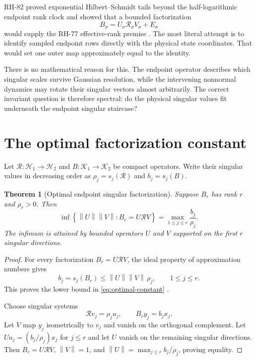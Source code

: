 \documentclass[11pt]{article}
\newtheorem{theorem}{Theorem}[section]
\theoremstyle{remark}
\newcommand{\norm}[1]{\left\lVert#1\right\rVert}
\newcommand{\cR}{\mathcal R}
\begin{document}
RH-82 proved exponential Hilbert--Schmidt tails beyond the half-logarithmic
endpoint rank clock and showed that a bounded factorization
\begin{equation}
 B_\sigma=U_\sigma\cR_\sigma V_\sigma+E_\sigma
 \label{eq:desired}
\end{equation}
would supply the RH-77 effective-rank premise \citep{WangHalfLog2026}.  The
most literal attempt is to identify sampled endpoint rows directly with the
physical state coordinates.  That would set one outer map approximately equal
to the identity.

There is no mathematical reason for this.  The endpoint operator describes
which singular scales survive Gaussian resolution, while the intervening
nonnormal dynamics may rotate their singular vectors almost arbitrarily.  The
correct invariant question is therefore spectral: do the physical singular
values fit underneath the endpoint singular staircase?

\section{The optimal factorization constant}

Let $\cR:\mathcal H_1\to\mathcal H_2$ and
$B:\mathcal K_1\to\mathcal K_2$ be compact operators.  Write their singular
values in decreasing order as $\rho_j=s_j(\cR)$ and $b_j=s_j(B)$.

\begin{theorem}[Optimal endpoint singular factorization]
\label{thm:optimal}
Suppose $B_r$ has rank $r$ and $\rho_r>0$.  Then
\begin{equation}
 \boxed{
 \inf\left\{\norm U\norm V:B_r=U\cR V\right\}
 =\max_{1\le j\le r}\frac{b_j}{\rho_j}.}
 \label{eq:optimal-constant}
\end{equation}
The infimum is attained by bounded operators $U$ and $V$ supported on the
first $r$ singular directions.
\end{theorem}

\begin{proof}
For every factorization $B_r=U\cR V$, the ideal property of approximation
numbers gives
\[
 b_j=s_j(B_r)\le\norm U\norm V\,\rho_j,
 \qquad1\le j\le r.
\]
This proves the lower bound in \eqref{eq:optimal-constant}
\citep{Simon2005}.

Choose singular systems
\[
 \cR v_j=\rho_j u_j,
 \qquad B_r y_j=b_jx_j.
\]
Let $V$ map $y_j$ isometrically to $v_j$ and vanish on the orthogonal
complement.  Let $Uu_j=(b_j/\rho_j)x_j$ for $j\le r$ and let $U$ vanish on
the remaining singular directions.  Then $B_r=U\cR V$,
$\norm V=1$, and
$\norm U=\max_{j\le r}b_j/\rho_j$, proving equality.
\end{proof}
\end{document}
